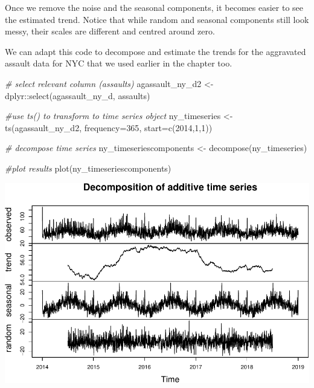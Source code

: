 \documentclass[
]{book}
\makeatletter
\newenvironment{Shaded}{\begin{snugshade}}{\end{snugshade}}
\newcommand{\AttributeTok}[1]{\textcolor[rgb]{0.61,0.61,0.61}{#1}}
\newcommand{\CommentTok}[1]{\textcolor[rgb]{0.37,0.37,0.37}{\textit{#1}}}
\newcommand{\DecValTok}[1]{\textcolor[rgb]{0.06,0.06,0.06}{#1}}
\newcommand{\FunctionTok}[1]{\textcolor[rgb]{0,0,0}{#1}}
\newcommand{\NormalTok}[1]{#1}
\newcommand{\OtherTok}[1]{\textcolor[rgb]{0.37,0.37,0.37}{#1}}
\newcommand{\SpecialCharTok}[1]{\textcolor[rgb]{0,0,0}{#1}}
\newenvironment{kframe}{%
\medskip{}
\setlength{\fboxsep}{.8em}
 \def\at@end@of@kframe{}%
 \ifinner\ifhmode%
  \def\at@end@of@kframe{\end{minipage}}%
  \begin{minipage}{\columnwidth}%
 \fi\fi%
 \def\FrameCommand##1{\hskip\@totalleftmargin \hskip-\fboxsep
 \colorbox{shadecolor}{##1}\hskip-\fboxsep
     \hskip-\linewidth \hskip-\@totalleftmargin \hskip\columnwidth}%
 \MakeFramed {\advance\hsize-\width
   \@totalleftmargin\z@ \linewidth\hsize
   \@setminipage}}%
 {\par\unskip\endMakeFramed%
 \at@end@of@kframe}
\renewenvironment{Shaded}{\begin{kframe}}{\end{kframe}}
\makeatother
\begin{document}
Once we remove the noise and the seasonal components, it becomes easier to see the estimated trend. Notice that while random and seasonal components still look messy, their scales are different and centred around zero.

We can adapt this code to decompose and estimate the trends for the aggravated assault data for NYC that we used earlier in the chapter too.

\begin{Shaded}
\begin{Highlighting}[]
\CommentTok{\# select relevant column (assaults)}
\NormalTok{agassault\_ny\_d2 }\OtherTok{\textless{}{-}}\NormalTok{ dplyr}\SpecialCharTok{::}\FunctionTok{select}\NormalTok{(agassault\_ny\_d, assaults)}

\CommentTok{\#use ts() to transform to time series object}
\NormalTok{ny\_timeseries }\OtherTok{\textless{}{-}} \FunctionTok{ts}\NormalTok{(agassault\_ny\_d2, }
                    \AttributeTok{frequency=}\DecValTok{365}\NormalTok{, }
                    \AttributeTok{start=}\FunctionTok{c}\NormalTok{(}\DecValTok{2014}\NormalTok{,}\DecValTok{1}\NormalTok{,}\DecValTok{1}\NormalTok{))}

\CommentTok{\# decompose time series}
\NormalTok{ny\_timeseriescomponents }\OtherTok{\textless{}{-}} \FunctionTok{decompose}\NormalTok{(ny\_timeseries)}

\CommentTok{\#plot results}
\FunctionTok{plot}\NormalTok{(ny\_timeseriescomponents)}
\end{Highlighting}
\end{Shaded}

\includegraphics{crime_mapping_files/figure-latex/decompose_8b-1.pdf}
\end{document}

